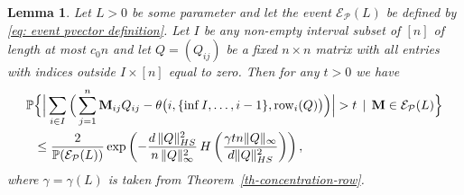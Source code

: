\documentclass[12pt]{article}
\newtheorem{lemma}[theorem]{Lemma}
\theoremstyle{definition}
\theoremstyle{plain}
\newcommand{\Event}{\mathcal{E}}
\def\ranmtx{{\bf{}M}}
\def\Prob{{\mathbb P}}
\def\Row{{\rm row}}
\def\pvector{{\mathcal P}}
\begin{document}
\begin{lemma}\label{l: main concentration light}
Let $L>0$ be some parameter and let the event $\Event_{\pvector}(L)$
be defined by \eqref{eq: event pvector definition}.
Let $I$ be any non-empty interval subset of $[n]$ of length at most $c_0 n$ and let $Q=(Q_{ij})$ be a fixed $n\times n$
matrix with all entries with indices outside $I\times[n]$ equal to zero.
Then for any $t>0$ we have
\begin{align*}
\Prob&\Big\{\Big|\sum_{i\in I}\Big(\sum_{j=1}^n{\ranmtx}_{ij}Q_{ij}-\theta\big(i,\{\inf I,\dots, i-1\},\Row_i(Q)\big)\Big)\Big|
>t\,\mid\,{\ranmtx}\in\Event_{\pvector}(L)
\Big\}\\
&\leq \frac{2}{\Prob(\Event_\pvector(L))}\exp\left(-\frac{d\,\|Q\|_{HS}^2}{n\,\|Q\|_\infty^2}
\, H\left(\frac{\gamma tn\|Q\|_\infty}{d\|Q\|_{HS}^2}\right)\right),
\end{align*}
where $\gamma=\gamma(L)$ is taken from Theorem~\ref{th-concentration-row}.
\end{lemma}
\end{document}
